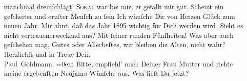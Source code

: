\begin{ledgroupsized}[t]{13cm}
               manchmal dreinſchlägt.\pend
           \pstart
           {\pb}\textsc{Sokal} war bei mir; er gefällt mir gut. Scheint ein geſcheiter und ernſter Menſch zu
                  ſein{\dotsfour}\pend
           \pstart
           Ich wünſche Dir von Herzen Glück zum neuen Jahr. Mir ahnt, daß das Jahr
                  1895 wichtig für Dich werden wird. Sieht es nicht vertrauenerweckend
               aus? Mit ſeiner runden Fünfheiten!\pend
           \pstart
           Was aber auch geſchehen mag, Gutes oder Allerbeſtes, wir bleiben die Alten, nicht
               wahr?\pend
           \pstart
           Herzlichſt und in Treue Dein{\\[\baselineskip]}\spacefill\mbox{Paul Goldmann\textcolor{gray}{.}}\pend
           \leftskip=0em{}\pstart
           \noindent{}{\pb}Bitte, empfiehl’ mich Deiner Frau Mutter und richte \label{T_mets_Goldmann_94-partII-22v}\label{T_mets_Goldmann_94-partII-22h} meine ergebenſten Neujahrs-Wünſche aus.\pend
           \pstart
           Was lieſt Du jetzt?\pend
           
         
         \endnumbering{}\end{ledgroupsized}  \newcommand{\dateiname}{L02630}\newcommand{\titel}{Paul Goldmann an Arthur Schnitzler, 31. 12. [1894]}\newcommand{\editorInnen}{Martin Anton Müller und Laura Untner}
      